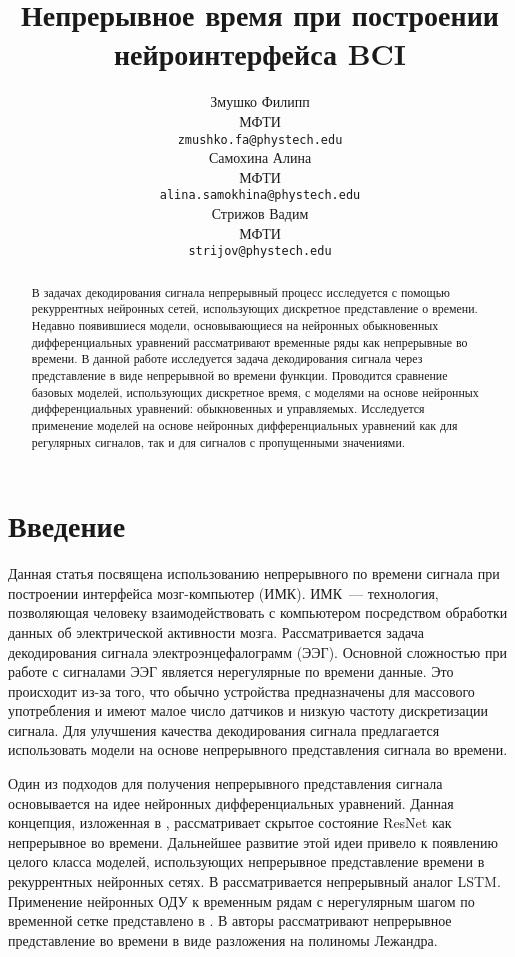 \documentclass{article}
\title{Непрерывное время при построении нейроинтерфейса BCI}
\author{ Змушко Филипп \\
	МФТИ \\
	\texttt{zmushko.fa@phystech.edu} \\
	\And
	Самохина Алина \\
	МФТИ\\
	\texttt{alina.samokhina@phystech.edu} \\
	\And
	Стрижов Вадим \\
	МФТИ\\
	\texttt{strijov@phystech.edu} \\
}
\date{}
\begin{document}
\maketitle

\begin{abstract}
	В задачах декодирования сигнала непрерывный процесс исследуется с помощью рекуррентных нейронных сетей, использующих дискретное представление о времени. Недавно появившиеся модели, основывающиеся на нейронных обыкновенных дифференциальных уравнений рассматривают временные ряды как непрерывные во времени.
    В данной работе исследуется задача декодирования сигнала через представление в виде непрерывной во времени функции. Проводится сравнение базовых моделей, использующих дискретное время, с моделями на основе нейронных дифференциальных уравнений: обыкновенных и управляемых. Исследуется применение моделей на основе нейронных дифференциальных уравнений как для регулярных сигналов, так и для сигналов с пропущенными значениями. 
\end{abstract}



\section{Введение}
Данная статья посвящена  использованию непрерывного по времени сигнала при построении интерфейса мозг-компьютер (ИМК). ИМК~--- технология, позволяющая человеку взаимодействовать с компьютером посредством обработки данных об электрической активности мозга. Рассматривается задача декодирования сигнала электроэнцефалограмм (ЭЭГ). Основной сложностью при работе с сигналами ЭЭГ является нерегулярные по времени данные. Это происходит из-за того, что обычно устройства предназначены для массового употребления и имеют малое число датчиков и низкую частоту дискретизации сигнала. Для улучшения качества декодирования сигнала предлагается использовать модели на основе непрерывного представления сигнала во времени.

Один из подходов для получения непрерывного представления сигнала основывается на идее нейронных дифференциальных уравнений. Данная концепция, изложенная в \cite{NEURIPS2018_69386f6b}, рассматривает скрытое состояние ResNet как непрерывное во времени. Дальнейшее развитие этой идеи привело к появлению целого класса моделей, использующих непрерывное представление времени в рекуррентных нейронных сетях. В \cite{lechner2020longterm} рассматривается непрерывный аналог LSTM. Применение нейронных ОДУ к временным рядам с нерегулярным шагом по временной сетке представлено в \cite{cde}. В \cite{NEURIPS2019_952285b9} авторы рассматривают непрерывное представление во времени в виде разложения на полиномы Лежандра. 
\end{document}
